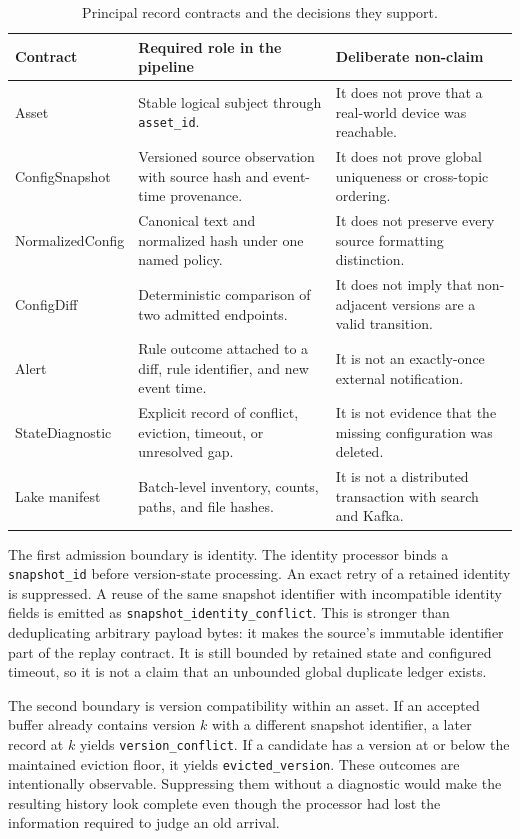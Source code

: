 \begin{table}[ht]
\centering
\caption{Principal record contracts and the decisions they support.}
\label{tab:contract-roles}
\small
\begin{tabularx}{\textwidth}{p{}X X}
\toprule
Contract & Required role in the pipeline & Deliberate non-claim \\
\midrule
Asset & Stable logical subject through \texttt{asset\_id}. & It does not prove that a real-world device was reachable. \\
ConfigSnapshot & Versioned source observation with source hash and event-time provenance. & It does not prove global uniqueness or cross-topic ordering. \\
NormalizedConfig & Canonical text and normalized hash under one named policy. & It does not preserve every source formatting distinction. \\
ConfigDiff & Deterministic comparison of two admitted endpoints. & It does not imply that non-adjacent versions are a valid transition. \\
Alert & Rule outcome attached to a diff, rule identifier, and new event time. & It is not an exactly-once external notification. \\
StateDiagnostic & Explicit record of conflict, eviction, timeout, or unresolved gap. & It is not evidence that the missing configuration was deleted. \\
Lake manifest & Batch-level inventory, counts, paths, and file hashes. & It is not a distributed transaction with search and Kafka. \\
\bottomrule
\end{tabularx}
\end{table}

The first admission boundary is identity. The identity processor binds a \texttt{snapshot\_id} before version-state processing. An exact retry of a retained identity is suppressed. A reuse of the same snapshot identifier with incompatible identity fields is emitted as \texttt{snapshot\_identity\_conflict}. This is stronger than deduplicating arbitrary payload bytes: it makes the source's immutable identifier part of the replay contract. It is still bounded by retained state and configured timeout, so it is not a claim that an unbounded global duplicate ledger exists.

The second boundary is version compatibility within an asset. If an accepted buffer already contains version $k$ with a different snapshot identifier, a later record at $k$ yields \texttt{version\_conflict}. If a candidate has a version at or below the maintained eviction floor, it yields \texttt{evicted\_version}. These outcomes are intentionally observable. Suppressing them without a diagnostic would make the resulting history look complete even though the processor had lost the information required to judge an old arrival.

